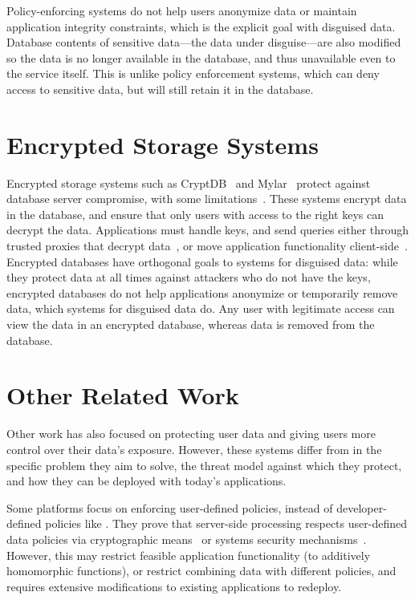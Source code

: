 %
Policy-enforcing systems do not help users anonymize data or maintain
application integrity constraints, which is the explicit goal with disguised
data.
%
Database contents of sensitive data---the data under disguise---are also
modified so the data is no longer available in the database, and thus
unavailable even to the service itself. This is unlike policy enforcement
systems, which can deny access to sensitive data, but will still retain it in
the database.
%

\section{Encrypted Storage Systems}
Encrypted storage systems such as CryptDB~\cite{cryptdb} and
Mylar~\cite{mylar} protect against database server compromise, with some
limitations~\cite{grubbs}.
%
These systems encrypt data in the database, and
ensure that only users with access to the right keys can decrypt the data.
%
Applications must handle keys, and send queries
either through trusted proxies that decrypt data~\cite{cryptdb}, or move
application functionality client-side~\cite{mylar}.
%
Encrypted databases have orthogonal goals to systems for disguised data: while they protect data at all times
against attackers who do not have the keys, encrypted databases do not help applications
anonymize or temporarily remove data, which systems for disguised data do.
%
Any user with legitimate access can view the data in an encrypted database,
whereas \xxed data is removed from the database.

\section{Other Related Work} 
Other work has also focused on protecting user data and giving users more
control over their data's exposure. However, these systems differ from \sys in
the specific problem they aim to solve, the threat model against which they
protect, and how they can be deployed with today's applications.

Some platforms focus on enforcing user-defined policies, instead of developer-defined
policies like \sys. They prove that server-side processing respects
user-defined data policies via cryptographic means~\cite{zeph} or
systems security mechanisms~\cite{riverbed}.
%
However, this may restrict feasible application functionality (\eg to additively
homomorphic functions), or restrict combining data with different policies, and
requires extensive modifications to existing applications to redeploy.

